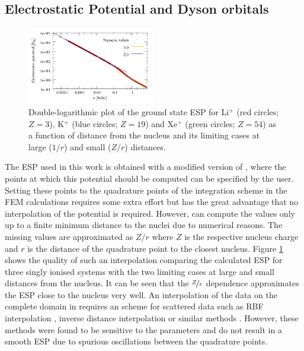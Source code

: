 \subsection{Electrostatic Potential and Dyson orbitals}
\begin{figure}
\includegraphics[width=0.5\textwidth]{Figures/ESP}
\caption{Double-logarithmic plot of the ground state ESP for Li$^+$ (red circles; $Z=3$), K$^+$ (blue circles; $Z=19$) and Xe$^+$ (green circles; $Z=54$) as a function of distance from the nucleus and its limiting cases at large ($1/r$) and small ($Z/r$) distances.}
\label{fig:esp}
\end{figure}
The ESP used in this work is obtained with a modified version of  \cite{nwchem}, where the points at which this potential should be computed can be specified by the user.
Setting these points to the quadrature points of the integration scheme in the FEM calculations requires some extra effort but has the great advantage that no interpolation of the potential is required.
However,  can compute the values only up to a finite minimum distance to the nuclei due to numerical reasons.
The missing values are approximated as $Z/r$ where $Z$ is the respective nucleus charge and $r$ is the distance of the quadrature point to the closest nucleus.
Figure \ref{fig:esp} shows the quality of such an interpolation comparing the calculated ESP for three singly ionised systems with the two limiting cases at large and small distances from the nucleus.
It can be seen that the $\nicefrac{Z}{r}$ dependence approximates the ESP close to the nucleus very well.
An interpolation of the data on the complete domain in  \cite{FreeWilly} requires an scheme for scattered data such as RBF interpolation \cite{rbfSE,rbfInterpol,rbfSurf}, inverse distance interpolation \cite{adapt_idw,idw} or similar methods \cite{CompInterp,idw_krieging,interpol}.
However, these methods were found to be sensitive to the parameters and do not result in a smooth ESP due to spurious oscillations between the quadrature points.


